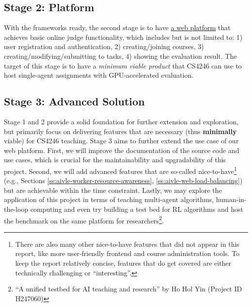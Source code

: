 \subsection{Stage 2: Platform}
With the frameworks ready, the second stage is to have \hyperref[ch:aivle-web]{a web platform} that achieves basic online judge functionality, which includes but is not limited to: 1) user registration and authentication, 2) creating/joining courses, 3) creating/modifying/submitting to tasks, 4) showing the evaluation result. The target of this stage is to have a \emph{minimum viable product} that CS4246 can use to host single-agent assignments with GPU-accelerated evaluation.

\subsection{Stage 3: Advanced Solution}
Stage 1 and 2 provide a solid foundation for further extension and exploration, but primarily focus on delivering features that are necessary (thus \textbf{minimally} viable) for CS4246 teaching. Stage 3 aims to further extend the use case of our web platform. First, we will improve the documentation of the source code and use cases, which is crucial for the maintainability and upgradability of this project. Second, we will add advanced features that are so-called nice-to-have\footnote{There are also many other nice-to-have features that did not appear in this report, like more user-friendly frontend and course administration tools. To keep the report relatively concise, features that do get covered are either technically challenging or ``interesting''.} (e.g., Sections \ref{ss:aivle-worker-resource-awareness}, \ref{ss:aivle-web-load-balancing}) but are achievable within the time constraint. Lastly, we may explore the application of this project in terms of teaching multi-agent algorithms, human-in-the-loop computing and even try building a test bed for RL algorithms and host the benchmark on the same platform for researchers\footnote{``A unified testbed for AI teaching and research'' by Ho Hol Yin (Project ID H247060)}.